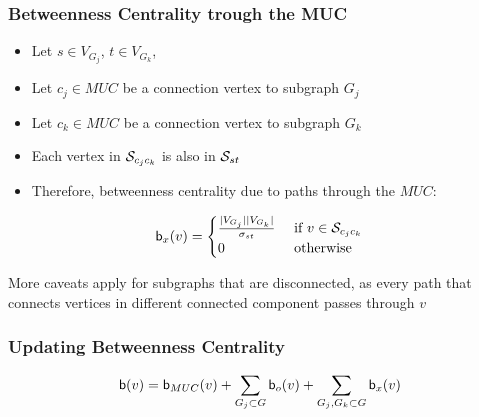 \begin{frame}
  \frametitle{Betweenness Centrality trough the MUC}
  
  \begin{itemize}
    \item Let $s \in V_{G_j}$, $t \in V_{G_k}$,
    \item Let $c_j \in MUC$ be a connection vertex to subgraph $G_j$
    \item Let $c_k \in MUC$ be a connection vertex to subgraph $G_k$
    \item Each vertex in $\mathcal{S}_{c_j c_k}$ is also in $\mathcal{S}_{st}$
    \item Therefore, betweenness centrality due to paths through the $MUC$:    
  \end{itemize}

  \begin{align*}
    \mathsf{b}_{x}(v) = \begin{cases}
      \frac{ |V_{G_j}| |V_{G_k}| }{ \sigma_{st} }		& \text{ if } v \in \mathcal{S}_{c_j c_k} \\
      0 						& \text{ otherwise }
    \end{cases}
  \end{align*}
  
  More caveats apply for subgraphs that are disconnected, as every path that connects vertices in different connected component passes through $v$
\end{frame}


\begin{frame}
  \frametitle{Updating Betweenness Centrality}
  
  {\huge
  \begin{align*}
    \mathsf{b}(v) = \mathsf{b}_{MUC}(v) + \sum_{G_j \subset G} \mathsf{b}_{o}(v) + \sum_{G_j, G_k \subset G} \mathsf{b}_{x}(v)
  \end{align*}
  }
\end{frame}


